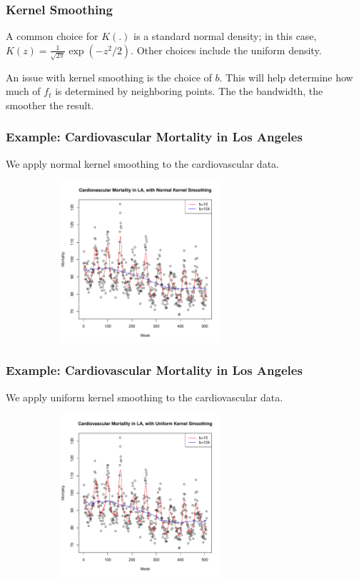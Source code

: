 \documentclass[%
xcolor=pdftex]{beamer}
\begin{document}
\begin{frame}
\frametitle{Kernel Smoothing}

A common choice for $K(.)$ is a standard normal density; in this case, $K(z) = \frac{1}{\sqrt{2\pi}} \exp(-z^2/2)$.  Other choices include the uniform density. \\

\vspace{5mm}

An issue with kernel smoothing is the choice of $b$.  This will help determine how much of $f_t$ is determined by neighboring points. The \underline{\hspace{10 mm}} the bandwidth, the smoother the result.

\end{frame}

\begin{frame}
\frametitle{Example: Cardiovascular Mortality in Los Angeles}

We apply normal kernel smoothing to the cardiovascular data.

\includegraphics[width=100mm, height=60mm]{kernel_normal.pdf}

\end{frame}

\begin{frame}
\frametitle{Example: Cardiovascular Mortality in Los Angeles}

We apply uniform kernel smoothing to the cardiovascular data.

\includegraphics[width=100mm, height=60mm]{kernel_u.pdf}

\end{frame}
\end{document}
